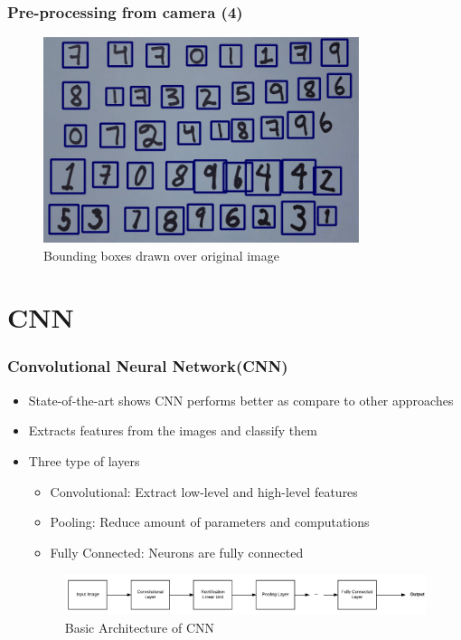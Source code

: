 \documentclass[11.5pt,aspectratio=1610,xcolor={usenames,dvipsnames,table}]{beamer}
\begin{document}
\begin{frame}
\frametitle{Pre-processing from camera (4)}
	
\begin{figure}[!h]
	\includegraphics[height = 6cm]{images/bbox.png}
	\caption{Bounding boxes drawn over original image}
\end{figure}
\end{frame}



\section{CNN}

\begin{frame}

\frametitle{Convolutional Neural Network(CNN)}

\begin{itemize}
	\item State-of-the-art shows CNN performs better as compare to other approaches\cite{cnn}
	\item Extracts features from the images and classify them
	\item Three type of layers
		\begin{itemize}
			\item Convolutional: Extract low-level and high-level features
			\item Pooling: Reduce amount of parameters and computations
			\item Fully Connected: Neurons are fully connected
		\end{itemize}	
	\begin{figure}[!h]
		\includegraphics[width=\textwidth]{images/cnn.png}
		\caption{Basic Architecture of CNN }
		
	\end{figure}

\end{itemize}
\end{frame}
\end{document}
